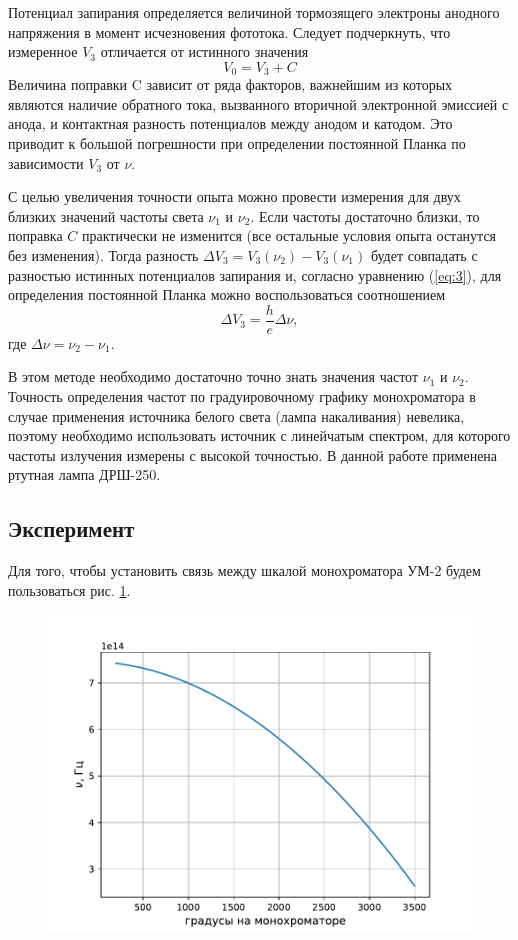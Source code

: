 Потенциал запирания определяется величиной тормозящего электроны анодного напряжения в момент исчезновения фототока. Следует подчеркнуть, что измеренное $V_{3}$ отличается от истинного значения
\begin{equation}
	V_0=V_{3}+C
\end{equation}
Величина поправки C зависит от ряда факторов, важнейшим из которых являются наличие обратного тока, вызванного вторичной электронной эмиссией с анода, и контактная разность потенциалов между анодом и катодом. Это приводит к большой погрешности 
при определении постоянной Планка по зависимости $V_{3}$ от $\nu$.

С целью увеличения точности опыта можно провести измерения для двух близких значений частоты света $\nu_1$ и $\nu_2$. Если частоты достаточно близки, то поправка $C$ практически не изменится (все остальные условия опыта останутся без изменения). Тогда разность $\Delta V_{3} = V_{3}(\nu_2)- V_{3}(\nu_1)$ будет совпадать с разностью истинных потенциалов запирания и, согласно уравнению (\ref{eq:3}), для определения постоянной Планка можно воспользоваться соотношением
\begin{equation}
	\Delta V_{3}=\frac he \Delta \nu,
\end{equation}
где $\Delta \nu= \nu_2- \nu_1$.

В этом методе необходимо достаточно точно знать значения частот $\nu_1$ и $\nu_2$. Точность определения частот по градуировочному графику монохроматора в случае применения источника белого света (лампа накаливания) невелика, поэтому необходимо использовать источник с линейчатым спектром, для которого частоты излучения измерены с высокой точностью. В данной работе применена ртутная лампа ДРШ-250. 

\subsection{Эксперимент}
Для того, чтобы установить связь между шкалой монохроматора УМ-2 будем пользоваться рис. \ref{fig:8}. 
\begin{figure}[H]
	\centering
	\includegraphics[scale=1]{scripts/podgon.pdf}
	\caption{}
	\label{fig:8}
\end{figure}

